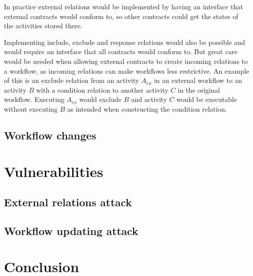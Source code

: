 \documentclass{article}
\begin{document}
		In practice external relations would be implemented by having an interface that external contracts would conform to, so other contracts could get the states of the activities stored there. 
		
		Implementing include, exclude and response relations would also be possible and would require an interface that all contracts would conform to. 
		But great care would be needed when allowing external contracts to create incoming relations to a workflow, as incoming relations can make workflows less restrictive. 
		An example of this is an exclude relation from an activity $A_{ex}$ in an external workflow to an activity $B$ with a condition relation to another activity $C$ in the original workflow. 
		Executing $A_{ex}$ would exclude $B$ and activity $C$ would be executable without executing $B$ as intended when constructing the condition relation.

		\subsection{Workflow changes}

	\section{Vulnerabilities}

		\subsection{External relations attack}

		\subsection{Workflow updating attack}

	\section{Conclusion}
\end{document}
